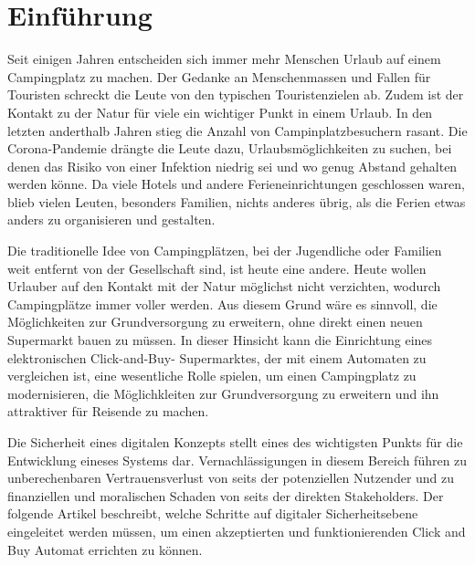 \section{Einführung}



Seit einigen Jahren entscheiden sich immer mehr Menschen Urlaub auf einem Campingplatz 
zu machen. Der Gedanke an Menschenmassen und Fallen für Touristen schreckt die Leute von
den typischen Touristenzielen ab. Zudem ist der Kontakt zu der Natur für viele ein wichtiger
Punkt in einem Urlaub. In den letzten anderthalb Jahren stieg die Anzahl von Campinplatzbesuchern
rasant. Die Corona-Pandemie drängte die Leute dazu, Urlaubsmöglichkeiten zu suchen, bei denen
das Risiko von einer Infektion niedrig sei und wo genug Abstand gehalten werden könne. Da viele 
Hotels und andere Ferieneinrichtungen geschlossen waren, blieb vielen Leuten, besonders Familien,
nichts anderes übrig, als die Ferien etwas anders zu organisieren und gestalten.

Die traditionelle Idee von Campingplätzen, bei der Jugendliche oder Familien weit entfernt von der 
Gesellschaft sind, ist heute eine andere. Heute wollen Urlauber auf den Kontakt mit der Natur
möglichst nicht verzichten, wodurch Campingplätze immer voller werden. Aus diesem Grund wäre es
sinnvoll, die Möglichkeiten zur Grundversorgung zu erweitern, ohne direkt einen neuen Supermarkt
bauen zu müssen. In dieser Hinsicht kann die Einrichtung eines elektronischen Click-and-Buy-
Supermarktes, der mit einem Automaten zu vergleichen ist, eine wesentliche Rolle spielen, um 
einen Campingplatz zu modernisieren, die Möglichkleiten zur Grundversorgung zu erweitern und 
ihn attraktiver für Reisende zu machen.

Die Sicherheit eines digitalen Konzepts stellt eines des wichtigsten Punkts für die Entwicklung
eineses Systems dar. Vernachlässigungen in diesem Bereich führen zu unberechenbaren Vertrauensverlust 
von seits der potenziellen Nutzender und zu finanziellen und moralischen Schaden von seits der direkten
Stakeholders. Der folgende Artikel beschreibt, welche Schritte auf digitaler Sicherheitsebene eingeleitet 
werden müssen, um einen akzeptierten und funktionierenden Click and Buy Automat errichten zu können. 